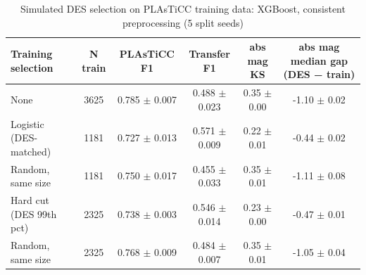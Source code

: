 \begin{table}
\centering
\caption{Simulated DES selection on PLAsTiCC training data: XGBoost, consistent preprocessing (5 split seeds)}
\begin{tabular}{lccccc}
\hline
Training selection & N train & PLAsTiCC F1 & Transfer F1 & abs mag KS & abs mag median gap (DES − train) \\
\hline
None & 3625 & 0.785 $\pm$ 0.007 & 0.488 $\pm$ 0.023 & 0.35 $\pm$ 0.00 & -1.10 $\pm$ 0.02 \\
Logistic (DES-matched) & 1181 & 0.727 $\pm$ 0.013 & 0.571 $\pm$ 0.009 & 0.22 $\pm$ 0.01 & -0.44 $\pm$ 0.02 \\
Random, same size & 1181 & 0.750 $\pm$ 0.017 & 0.455 $\pm$ 0.033 & 0.35 $\pm$ 0.01 & -1.11 $\pm$ 0.08 \\
Hard cut (DES 99th pct) & 2325 & 0.738 $\pm$ 0.003 & 0.546 $\pm$ 0.014 & 0.23 $\pm$ 0.00 & -0.47 $\pm$ 0.01 \\
Random, same size & 2325 & 0.768 $\pm$ 0.009 & 0.484 $\pm$ 0.007 & 0.35 $\pm$ 0.01 & -1.05 $\pm$ 0.04 \\
\hline
\end{tabular}
\end{table}
